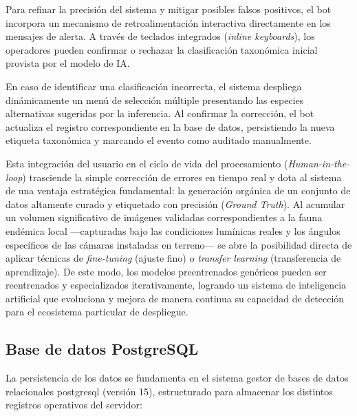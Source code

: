 \documentclass[a4paper, 12pt]{report}
\begin{document}
Para refinar la precisión del sistema y mitigar posibles falsos positivos, el bot incorpora un mecanismo de retroalimentación interactiva directamente en los mensajes de alerta. A través de teclados integrados (\textit{inline keyboards}), los operadores pueden confirmar o rechazar la clasificación taxonómica inicial provista por el modelo de IA.

En caso de identificar una clasificación incorrecta, el sistema despliega dinámicamente un menú de selección múltiple presentando las especies alternativas sugeridas por la inferencia. Al confirmar la corrección, el bot actualiza el registro correspondiente en la base de datos, persistiendo la nueva etiqueta taxonómica y marcando el evento como auditado manualmente.

Esta integración del usuario en el ciclo de vida del procesamiento (\textit{Human-in-the-loop}) trasciende la simple corrección de errores en tiempo real y dota al sistema de una ventaja estratégica fundamental: la generación orgánica de un conjunto de datos altamente curado y etiquetado con precisión (\textit{Ground Truth}). Al acumular un volumen significativo de imágenes validadas correspondientes a la fauna endémica local —capturadas bajo las condiciones lumínicas reales y los ángulos específicos de las cámaras instaladas en terreno— se abre la posibilidad directa de aplicar técnicas de \textit{fine-tuning} (ajuste fino) o \textit{transfer learning} (transferencia de aprendizaje). De este modo, los modelos preentrenados genéricos pueden ser reentrenados y especializados iterativamente, logrando un sistema de inteligencia artificial que evoluciona y mejora de manera continua su capacidad de detección para el ecosistema particular de despliegue.

\subsection{Base de datos PostgreSQL}

La persistencia de los datos se fundamenta en el sistema gestor de bases de datos relacionales \gls{postgresql} (versión 15), estructurado para almacenar los distintos registros operativos del servidor:
\end{document}
